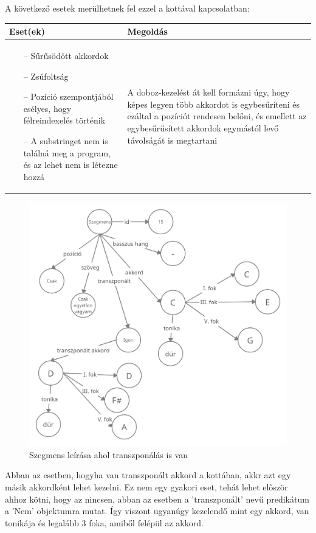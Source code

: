 A következő esetek merülhetnek fel ezzel a kottával kapcsolatban:
\begin{center}
	\begin{tabular}{ |p{7cm}|p{7cm}| }
		\hline
		Eset(ek) & Megoldás\\ 
		\hline
		\begin{itemize}
			\item[--] Sűrűsödött akkordok
			\item[--] Zsúfoltság
			\item[--] Pozíció szempontjából esélyes, hogy félreindexelés történik
			\item[--] A substringet nem is találná meg a program, és az lehet nem is létezne hozzá
		\end{itemize} & A doboz-kezelést át kell formázni úgy, hogy képes legyen több akkordot is egybesűríteni és ezáltal a pozíciót rendesen belőni, és emellett az egybesűrűsített akkordok egymástól levő távolságát is megtartani \\ 
		\hline
	\end{tabular}
\end{center}
\newpage
\begin{figure}[h]
	\includegraphics[scale=0.29]{images/rdf_graph_5.png}
	\caption{Szegmens leírása ahol transzponálás is van}
	\label{fig:graph5}
\end{figure}
Abban az esetben, hogyha van transzponált akkord a kottában, akkr azt egy másik akkordként lehet kezelni. Ez nem egy gyakori eset, tehát lehet először ahhoz kötni, hogy az nincsen, abban az esetben a 'transzponált' nevű predikátum a 'Nem' objektumra mutat. Így viszont ugyanúgy kezelendő mint egy akkord, van tonikája és legalább 3 foka, amiből felépül az akkord.
